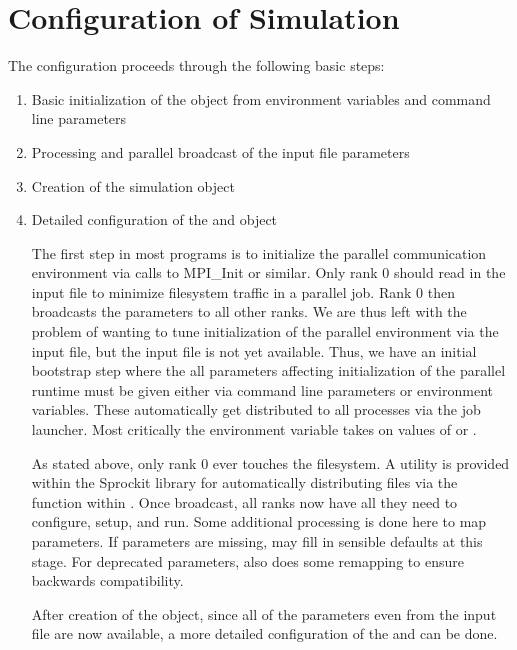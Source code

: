 \section{Configuration of Simulation}
The configuration proceeds through the following basic steps:
\begin{enumerate}
\item Basic initialization of the  object from environment variables and command line parameters
\item Processing and parallel broadcast of the input file parameters
\item Creation of the simulation  object
\item Detailed configuration of the  and  object

The first step in most programs is to initialize the parallel communication environment via calls to MPI\_Init or similar.
Only rank 0 should read in the input file to minimize filesystem traffic in a parallel job.
Rank 0 then broadcasts the parameters to all other ranks.
We are thus left with the problem of wanting to tune initialization of the parallel environment via the input file,
but the input file is not yet available.
Thus, we have an initial bootstrap step where the all parameters affecting initialization of the parallel runtime must be given
either via command line parameters or environment variables.
These automatically get distributed to all processes via the job launcher.
Most critically the environment variable  takes on values of  or .

As stated above, only rank 0 ever touches the filesystem.
A utility is provided within the Sprockit library for automatically distributing files via the  function within .
Once broadcast, all ranks now have all they need to configure, setup, and run.
Some additional processing is done here to map parameters.
If parameters are missing, \sstmacro may fill in sensible defaults at this stage.
For deprecated parameters, \sstmacro also does some remapping to ensure backwards compatibility.

After creation of the  object, 
since all of the parameters even from the input file are now available,
a more detailed configuration of the  and  can be done.


\end{enumerate}
